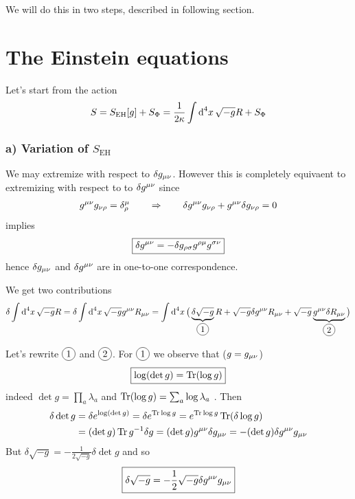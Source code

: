 \documentclass[../main/main.tex]{subfiles}
\begin{document}
We will do this in two steps, described in following section. 

\section{The Einstein equations}

Let's start from the action 
\[S=S_{\text{EH}}[g]+S_\Phi=\frac1{2\kappa}\int\textup{d}^{4}{x}\,\sqrt{-g}R+S_\Phi\]

\subsubsection{a) Variation of $S_{\text{EH}}$}

We may extremize with respect to $\delta g_{\mu \nu}$. However this is completely equivaent to extremizing with respect to to $\delta g^{\mu \nu}$ since
\[g^{\mu \nu}g_{\nu \rho}=\delta^\mu_\rho\qquad\Rightarrow\qquad\delta g^{\mu \nu}g_{\nu \rho}+g^{\mu \nu}\delta g_{\nu \rho}=0\]
implies
\begin{equation}\boxed{
\delta g^{\mu \nu}=-\delta g_{\rho \sigma}g^{\rho \mu}g^{\sigma \nu}
}\end{equation}
hence $\delta g_{\mu \nu}$ and $\delta g^{\mu \nu}$ are in one-to-one correspondence. 

We get two contributions
\[\delta\int\diff4x\sqrt{-g}R=\delta\int\diff4x\sqrt{-g}\imet\mu\nu\ricc\mu\nu=\int\diff4x\big(\underbrace{\delta\sqrt{-g}}_{\circled1}R+\sqrt{-g}\delta\imet\mu\nu\ricc\mu\nu+\sqrt{-g}\underbrace{\imet\mu\nu\delta\ricc\mu\nu}_{\circled2}\big)\]

Let's rewrite $\circled1$ and $\circled2$. 
For $\circled1$ we observe that ($g=g_{\mu \nu}$)
\begin{equation}\boxed{
\log(\det g)=\Tr(\log g)
}\end{equation}
indeed $\det g=\prod_a\lambda_a$ and $\Tr(\log g)=\sum_a\log \lambda_a$ . Then
\begin{align*}
\delta\det g&=\delta e^{\log(\det g)}=\delta e^{\Tr\log g}=e^{\Tr\log g}\Tr(\delta\log g)\\
&=(\det g)\Tr\inv g\delta g=(\det g)\imet\mu\nu\delta\met\mu\nu=-(\det g)\delta\imet\mu\nu\met\mu\nu
\end{align*}
But $\delta\sqrt{-g}=-\frac1{2\sqrt{-g}}\delta\det g$ and so
\begin{equation}\boxed{
\delta\sqrt{-g}=-\frac12\sqrt{-g}\delta g^{\mu \nu}g_{\mu \nu}
}\end{equation}
\end{document}
